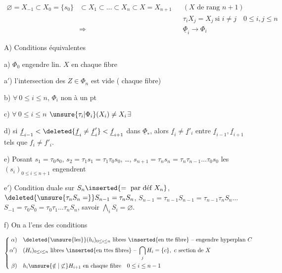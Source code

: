 
\[
\begin{aligned}
\varnothing=X_{-1}\subset X_0=\{s_0\}&\subset X_1\subset\ldots\subset X_n\subset X=X_{n+1}
 & & (X\text{ de rang }n+1)\\
&&&\tau_i X_j=X_j\ \text{si }i\ne j\quad 0\leq i,j\leq n\\
&\Longrightarrow &&\underline\Phi_i\longrightarrow\Phi_i
\end{aligned}
\]

A) Conditions équivalentes


a) $\Phi_0$ engendre lin. $X$ en chaque fibre

a$'$) l'intersection des $Z\in\Phi_n$ est vide (  chaque fibre)

b) $\forall\ 0\leq i\leq n$, $\Phi_i$ non  à un pt

c) $\forall\ 0\leq i\leq n$ $\unsure{\tau_i|\Phi_i}(X_i)\ne X_i$\qquad $\exists$

d) si $\underline f_{i-1}<\deleted{\underline f_i\ne\underline f'_i}<\underline f_{i+1}$ dans $\underline\Phi_*$, alors $\underline f_i\ne\underline f'_i$ entre $\underline f_{i-1},\underline f_{i+1}$ tels que $f_i\ne f'_i$.

e) Posant $s_1=\tau_0 s_0$, $s_2=\tau_1s_1=\tau_1\tau_0s_0$, \ldots, $s_{n+1}=\tau_ns_n=\tau_n\tau_{n-1}\ldots\tau_0s_0$ les $(s_i)_{0\leq i\leq n+1}$ engendrent  

e$'$) Condition duale sur $S_n\inserted{=\text{ par déf }X_n}$, $\deleted{\unsure{\tau_n S_n=}}S_{n-1}=\tau_n S_n$, $S_{n-1}=\tau_{n-1}S_{n-1}=\tau_{n-1}\tau_n S_n\ldots$ $S_{-1}=\tau_0S_0=\tau_0\tau_1\ldots\tau_n S_n$, savoir $\bigwedge_i S_i=\varnothing$.

 f) On a l'ens des  conditions

\[
\left\{\begin{aligned}
\alpha)&\quad \deleted{\unsure{\text{les}}}(h_i)_{0\leq i\leq n}\ \text{libres \inserted{en tte fibre} -- engendre hyperplan }C\\
\alpha')&\quad(H_i)_{0\leq i\leq n}\ \text{libres \inserted{en ttes fibres} -- }\bigcap_j H_i=\{c\},\ c\ \text{section de }X\\
\beta)&\quad h_i\unsure{\notin|\not\subset}H_{i+1}\ \text{en chaque fibre}\quad 0\leq i\leq n-1
\end{aligned}\right.
\]

